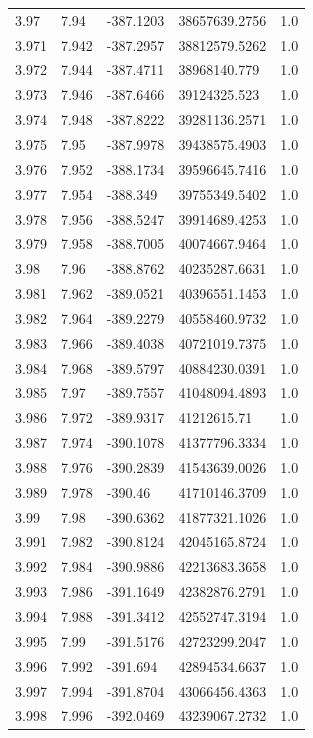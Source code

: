 \begin{tabular}{lllll}
3.97 & 7.94 & -387.1203 & 38657639.2756 & 1.0 \\
3.971 & 7.942 & -387.2957 & 38812579.5262 & 1.0 \\
3.972 & 7.944 & -387.4711 & 38968140.779 & 1.0 \\
3.973 & 7.946 & -387.6466 & 39124325.523 & 1.0 \\
3.974 & 7.948 & -387.8222 & 39281136.2571 & 1.0 \\
3.975 & 7.95 & -387.9978 & 39438575.4903 & 1.0 \\
3.976 & 7.952 & -388.1734 & 39596645.7416 & 1.0 \\
3.977 & 7.954 & -388.349 & 39755349.5402 & 1.0 \\
3.978 & 7.956 & -388.5247 & 39914689.4253 & 1.0 \\
3.979 & 7.958 & -388.7005 & 40074667.9464 & 1.0 \\
3.98 & 7.96 & -388.8762 & 40235287.6631 & 1.0 \\
3.981 & 7.962 & -389.0521 & 40396551.1453 & 1.0 \\
3.982 & 7.964 & -389.2279 & 40558460.9732 & 1.0 \\
3.983 & 7.966 & -389.4038 & 40721019.7375 & 1.0 \\
3.984 & 7.968 & -389.5797 & 40884230.0391 & 1.0 \\
3.985 & 7.97 & -389.7557 & 41048094.4893 & 1.0 \\
3.986 & 7.972 & -389.9317 & 41212615.71 & 1.0 \\
3.987 & 7.974 & -390.1078 & 41377796.3334 & 1.0 \\
3.988 & 7.976 & -390.2839 & 41543639.0026 & 1.0 \\
3.989 & 7.978 & -390.46 & 41710146.3709 & 1.0 \\
3.99 & 7.98 & -390.6362 & 41877321.1026 & 1.0 \\
3.991 & 7.982 & -390.8124 & 42045165.8724 & 1.0 \\
3.992 & 7.984 & -390.9886 & 42213683.3658 & 1.0 \\
3.993 & 7.986 & -391.1649 & 42382876.2791 & 1.0 \\
3.994 & 7.988 & -391.3412 & 42552747.3194 & 1.0 \\
3.995 & 7.99 & -391.5176 & 42723299.2047 & 1.0 \\
3.996 & 7.992 & -391.694 & 42894534.6637 & 1.0 \\
3.997 & 7.994 & -391.8704 & 43066456.4363 & 1.0 \\
3.998 & 7.996 & -392.0469 & 43239067.2732 & 1.0 \\

\end{tabular}
